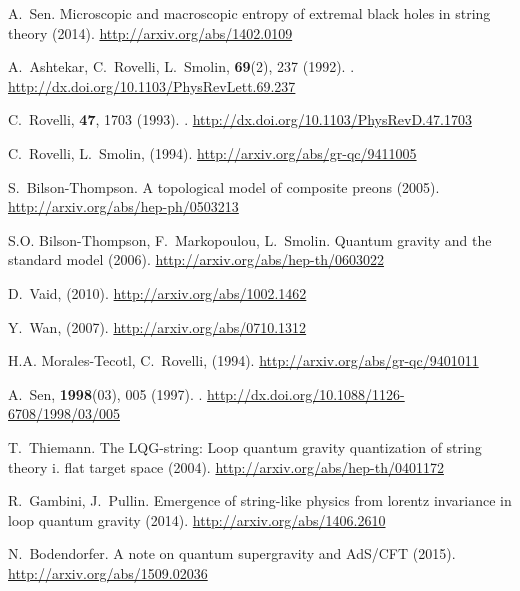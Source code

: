 \documentclass{ws-mpla}
\begin{document}
\begin{thebibliography}{0}
A.~Sen.
\newblock Microscopic and macroscopic entropy of extremal black holes in string
  theory (2014).
\newblock \urlprefix\url{http://arxiv.org/abs/1402.0109}

A.~Ashtekar, C.~Rovelli, L.~Smolin,  \textbf{69}(2), 237 (1992).
\newblock {}.
\newblock \urlprefix\url{http://dx.doi.org/10.1103/PhysRevLett.69.237}

C.~Rovelli,  \textbf{47}, 1703 (1993).
\newblock {}.
\newblock \urlprefix\url{http://dx.doi.org/10.1103/PhysRevD.47.1703}

C.~Rovelli, L.~Smolin,   (1994).
\newblock \urlprefix\url{http://arxiv.org/abs/gr-qc/9411005}

S.~Bilson-Thompson.
\newblock A topological model of composite preons (2005).
\newblock \urlprefix\url{http://arxiv.org/abs/hep-ph/0503213}

S.O. Bilson-Thompson, F.~Markopoulou, L.~Smolin.
\newblock Quantum gravity and the standard model (2006).
\newblock \urlprefix\url{http://arxiv.org/abs/hep-th/0603022}

D.~Vaid,   (2010).
\newblock \urlprefix\url{http://arxiv.org/abs/1002.1462}

Y.~Wan,   (2007).
\newblock \urlprefix\url{http://arxiv.org/abs/0710.1312}

H.A. Morales-Tecotl, C.~Rovelli,   (1994).
\newblock \urlprefix\url{http://arxiv.org/abs/gr-qc/9401011}

A.~Sen,  \textbf{1998}(03), 005 (1997).
\newblock {}.
\newblock \urlprefix\url{http://dx.doi.org/10.1088/1126-6708/1998/03/005}

T.~Thiemann.
\newblock The {LQG}-string: Loop quantum gravity quantization of string theory
  i. flat target space (2004).
\newblock \urlprefix\url{http://arxiv.org/abs/hep-th/0401172}

R.~Gambini, J.~Pullin.
\newblock Emergence of string-like physics from lorentz invariance in loop
  quantum gravity (2014).
\newblock \urlprefix\url{http://arxiv.org/abs/1406.2610}

N.~Bodendorfer.
\newblock A note on quantum supergravity and {AdS}/{CFT} (2015).
\newblock \urlprefix\url{http://arxiv.org/abs/1509.02036}


\end{thebibliography}
\end{document}
